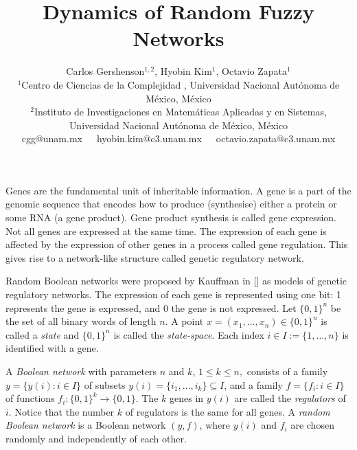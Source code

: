 \documentclass[letterpaper]{article}
\title{Dynamics of Random Fuzzy Networks}
\author{Carlos Gershenson$^{1,2}$, Hyobin Kim$^1$, Octavio Zapata$^1$
\mbox{}\\
$^1$Centro de Ciencias de la Complejidad , Universidad Nacional Aut\'onoma de M\'exico, M\'exico \\
$^2$Instituto de Investigaciones en Matem\'aticas Aplicadas y en Sistemas, Universidad Nacional Aut\'onoma de M\'exico, M\'exico \\
cgg@unam.mx\ \ \ 
hyobin.kim@c3.unam.mx\ \ \ 
octavio.zapata@c3.unam.mx} %
\begin{document}
\maketitle
Genes are the fundamental unit of inheritable information. 
A gene is a part of the genomic sequence that encodes how to produce (synthesise) either a protein or some RNA (a gene product). 
Gene product synthesis is called gene expression. 
Not all genes are expressed at the same time.
The expression of each gene is affected by the expression of other genes in a process called gene regulation. 
This gives rise to a network-like structure called genetic regulatory network. %

Random Boolean networks were proposed by Kauffman in [] as models of genetic regulatory networks.
 The expression of each gene is represented using one bit: 1 represents the gene is expressed, and 0  the gene is not expressed.
Let $\{0,1\}^n$ be the set of all binary words of length $n$. A point $x=(x_1,\dots, x_n)\in \{0,1\}^n$ is called  a \emph{state} and $\{0,1\}^n$ is called the \emph{state-space}. Each index $i\in I:=\{1,\dots,n\}$ is identified with a gene.

A \emph{Boolean network} with parameters $n$ and $k$, $1\leq k\leq n,$ 
consists of a family 
$y=\{y(i):i\in I\}$
of
subsets $y(i)=\{i_1,\dots,i_k\}\subseteq I$, and a family $f=\{f_i: i\in I\}$ of functions $f_i\colon \{0,1\}^{k}\rightarrow \{0,1\}$. 
The $k$ genes in $y(i)$ are called the \emph{regulators} of $i$.
Notice that the number $k$ of regulators is the same for all genes.
A \emph{random Boolean network} is a Boolean network $(y,f)$, where   $y(i)$ and $f_i$ are chosen randomly and  independently of each other. %
\end{document}
